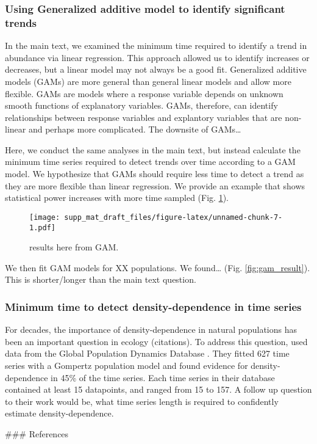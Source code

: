 \documentclass[12pt,]{article}
\begin{document}
\clearpage 

\subsubsection{Using Generalized additive model to identify significant
trends}\label{using-generalized-additive-model-to-identify-significant-trends}

In the main text, we examined the minimum time required to identify a
trend in abundance via linear regression. This approach allowed us to
identify increases or decreases, but a linear model may not always be a
good fit. Generalized additive models (GAMs) are more general than
general linear models and allow more flexible. GAMs are models where a
response variable depends on unknown smooth functions of explanatory
variables. GAMs, therefore, can identify relationships between response
variables and explantory variables that are non-linear and perhaps more
complicated. The downsite of GAMs\ldots{}

Here, we conduct the same analyses in the main text, but instead
calculate the minimum time series required to detect trends over time
according to a GAM model. We hypothesize that GAMs should require less
time to detect a trend as they are more flexible than linear regression.
We provide an example that shows statistical power increases with more
time sampled (Fig. \ref{fig:gam_example}).

\begin{figure}[htbp]
\centering
\texttt{[image: supp\_mat\_draft\_files/figure-latex/unnamed-chunk-7-1.pdf]}
\caption{results here from GAM.\label{fig:gam_example}}
\end{figure}

We then fit GAM models for XX populations. We found\ldots{} (Fig.
\ref{fig:gam_result}). This is shorter/longer than the main text
question.

\subsubsection{Minimum time to detect density-dependence in time
series}\label{minimum-time-to-detect-density-dependence-in-time-series}

For decades, the importance of density-dependence in natural populations
has been an important question in ecology (citations). To address this
question, \citet{Knape2012} used data from the Global Population
Dynamics Database \citep{GPDD2010}. They fitted 627 time series with a
Gompertz population model and found evidence for density-dependence in
45\% of the time series. Each time series in their database contained at
least 15 datapoints, and ranged from 15 to 157. A follow up question to
their work would be, what time series length is required to confidently
estimate density-dependence.

\clearpage
\#\#\# References


\end{document}
